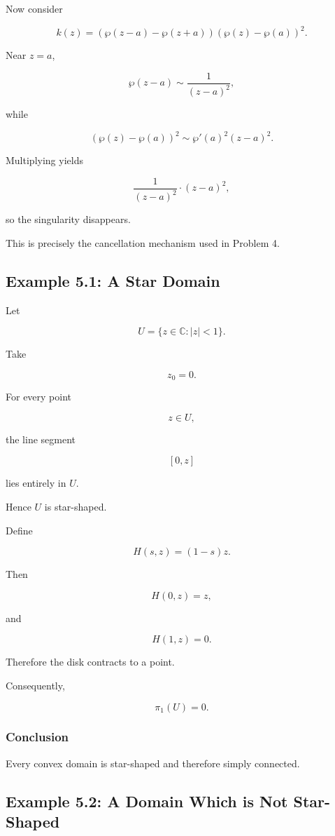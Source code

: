 \documentclass[12pt,a4paper]{article}
\theoremstyle{notespace}
\begin{document}
Now consider

\[
k(z)
=
(\wp(z-a)-\wp(z+a))
(\wp(z)-\wp(a))^2.
\]

Near \(z=a\),

\[
\wp(z-a)
\sim
\frac1{(z-a)^2},
\]

while

\[
(\wp(z)-\wp(a))^2
\sim
\wp'(a)^2(z-a)^2.
\]

Multiplying yields

\[
\frac1{(z-a)^2}
\cdot
(z-a)^2,
\]

so the singularity disappears.

This is precisely the cancellation mechanism used in Problem 4.

\subsection{Example 5.1: A Star Domain}

Let

\[
U
=
\{z\in\mathbb C:|z|<1\}.
\]

Take

\[
z_0=0.
\]

For every point

\[
z\in U,
\]

the line segment

\[
[0,z]
\]

lies entirely in \(U\).

Hence \(U\) is star-shaped.

Define

\[
H(s,z)
=
(1-s)z.
\]

Then

\[
H(0,z)=z,
\]

and

\[
H(1,z)=0.
\]

Therefore the disk contracts to a point.

Consequently,

\[
\pi_1(U)=0.
\]

\subsubsection*{Conclusion}

Every convex domain is star-shaped and therefore simply connected.

\subsection{Example 5.2: A Domain Which is Not Star-Shaped}
\end{document}
